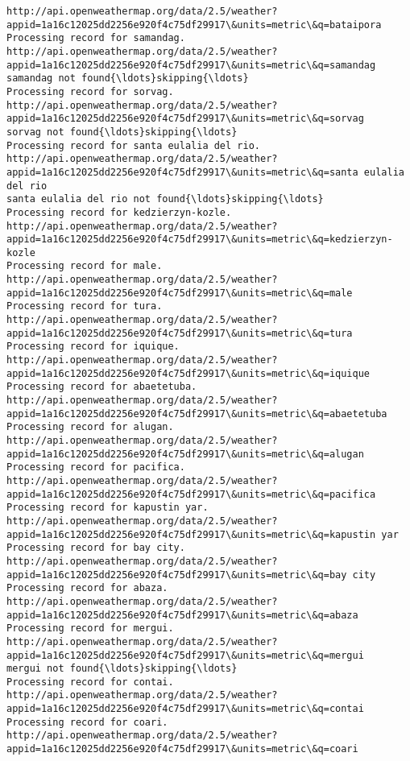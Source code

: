 \documentclass[11pt]{article}
\begin{document}
\begin{Verbatim}[commandchars=\\\{\}]
http://api.openweathermap.org/data/2.5/weather?appid=1a16c12025dd2256e920f4c75df29917\&units=metric\&q=bataipora
Processing record for samandag.
http://api.openweathermap.org/data/2.5/weather?appid=1a16c12025dd2256e920f4c75df29917\&units=metric\&q=samandag
samandag not found{\ldots}skipping{\ldots}
Processing record for sorvag.
http://api.openweathermap.org/data/2.5/weather?appid=1a16c12025dd2256e920f4c75df29917\&units=metric\&q=sorvag
sorvag not found{\ldots}skipping{\ldots}
Processing record for santa eulalia del rio.
http://api.openweathermap.org/data/2.5/weather?appid=1a16c12025dd2256e920f4c75df29917\&units=metric\&q=santa eulalia del rio
santa eulalia del rio not found{\ldots}skipping{\ldots}
Processing record for kedzierzyn-kozle.
http://api.openweathermap.org/data/2.5/weather?appid=1a16c12025dd2256e920f4c75df29917\&units=metric\&q=kedzierzyn-kozle
Processing record for male.
http://api.openweathermap.org/data/2.5/weather?appid=1a16c12025dd2256e920f4c75df29917\&units=metric\&q=male
Processing record for tura.
http://api.openweathermap.org/data/2.5/weather?appid=1a16c12025dd2256e920f4c75df29917\&units=metric\&q=tura
Processing record for iquique.
http://api.openweathermap.org/data/2.5/weather?appid=1a16c12025dd2256e920f4c75df29917\&units=metric\&q=iquique
Processing record for abaetetuba.
http://api.openweathermap.org/data/2.5/weather?appid=1a16c12025dd2256e920f4c75df29917\&units=metric\&q=abaetetuba
Processing record for alugan.
http://api.openweathermap.org/data/2.5/weather?appid=1a16c12025dd2256e920f4c75df29917\&units=metric\&q=alugan
Processing record for pacifica.
http://api.openweathermap.org/data/2.5/weather?appid=1a16c12025dd2256e920f4c75df29917\&units=metric\&q=pacifica
Processing record for kapustin yar.
http://api.openweathermap.org/data/2.5/weather?appid=1a16c12025dd2256e920f4c75df29917\&units=metric\&q=kapustin yar
Processing record for bay city.
http://api.openweathermap.org/data/2.5/weather?appid=1a16c12025dd2256e920f4c75df29917\&units=metric\&q=bay city
Processing record for abaza.
http://api.openweathermap.org/data/2.5/weather?appid=1a16c12025dd2256e920f4c75df29917\&units=metric\&q=abaza
Processing record for mergui.
http://api.openweathermap.org/data/2.5/weather?appid=1a16c12025dd2256e920f4c75df29917\&units=metric\&q=mergui
mergui not found{\ldots}skipping{\ldots}
Processing record for contai.
http://api.openweathermap.org/data/2.5/weather?appid=1a16c12025dd2256e920f4c75df29917\&units=metric\&q=contai
Processing record for coari.
http://api.openweathermap.org/data/2.5/weather?appid=1a16c12025dd2256e920f4c75df29917\&units=metric\&q=coari

\end{Verbatim}
\end{document}
